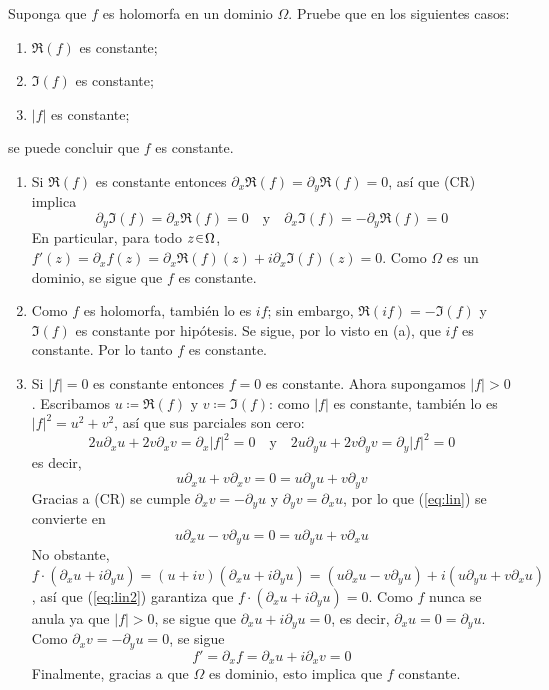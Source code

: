 \setcounter{eje}{12}
\begin{ejer}
Suponga que $f$ es holomorfa en un dominio $\Omega$. Pruebe que en los siguientes casos:
\begin{enumerate}[label=(\alph*), leftmargin=1.8em]
    \item $\Re(f)$ es constante;
    \item $\Im(f)$ es constante;
    \item $|f|$ es constante;
\end{enumerate}
se puede concluir que $f$ es constante.
\end{ejer}
\begin{sol}
\begin{enumerate}[label=(\alph*), leftmargin=1.8em]
\item 
Si $\Re(f)$ es constante entonces $\partial_x\Re(f) = \partial_y\Re(f) = 0$, así que (CR) implica
\[
\partial_y\Im(f) = \partial_x\Re(f) = 0%
\quad\text{y}\quad%
\partial_x\Im(f) = -\partial_y\Re(f) = 0
\]
En particular, para todo $z\en\Omega$, $f'(z) = \partial_xf(z) = \partial_x\Re(f)(z) + i\partial_x\Im(f)(z) = 0$. Como $\Omega$ es un dominio, se sigue que $f$ es constante.
\item 
Como $f$ es holomorfa, también lo es $if$; sin embargo, $\Re(if) = -\Im(f)$ y $\Im(f)$ es constante por hipótesis. Se sigue, por lo visto en (a), que $if$ es constante. Por lo tanto $f$ es constante.
\item 
Si $|f| = 0$ es constante entonces $f=0$ es constante. Ahora supongamos $|f| > 0$. Escribamos $u \coloneqq \Re(f)$ y $v\coloneq \Im(f)$: como $|f|$ es constante, también lo es $|f|^2 = u^2 + v^2$, así que sus parciales son cero:
\[
2u{\partial_xu} + 2v\partial_xv = \partial_x|f|^2 = 0
\quad\text{y}\quad
2u{\partial_yu} + 2v\partial_yv = \partial_y|f|^2 = 0
\]
es decir,
\begin{equation}\label{eq:lin}
u\partial_xu + v\partial_xv=0= u\partial_yu+v\partial_yv
\end{equation}
Gracias a (CR) se cumple $\partial_xv = -\partial_yu$ y $\partial_yv = \partial_xu$, por lo que (\ref{eq:lin}) se convierte en
\begin{equation}\label{eq:lin2}
u\partial_xu - v\partial_yu = 0 = u\partial_yu+v\partial_xu
\end{equation}
No obstante, $f\cdot(\partial_xu + i \partial_yu) = (u+iv)(\partial_xu + i \partial_yu) = (u\partial_xu - v\partial_yu) + i(u\partial_yu+v\partial_xu)$, así que (\ref{eq:lin2}) garantiza que $f\cdot(\partial_xu + i \partial_yu) = 0$. Como $f$ nunca se anula ya que $|f|>0$, se sigue que $\partial_xu + i \partial_yu = 0$, es decir, $\partial_xu = 0 = \partial_yu$. Como $\partial_xv = -\partial_yu = 0$, se sigue
\[
f' = \partial_xf = \partial_xu + i\partial_xv = 0
\]
Finalmente, gracias a que $\Omega$ es dominio, esto implica que $f$ constante.
\end{enumerate}
\end{sol}